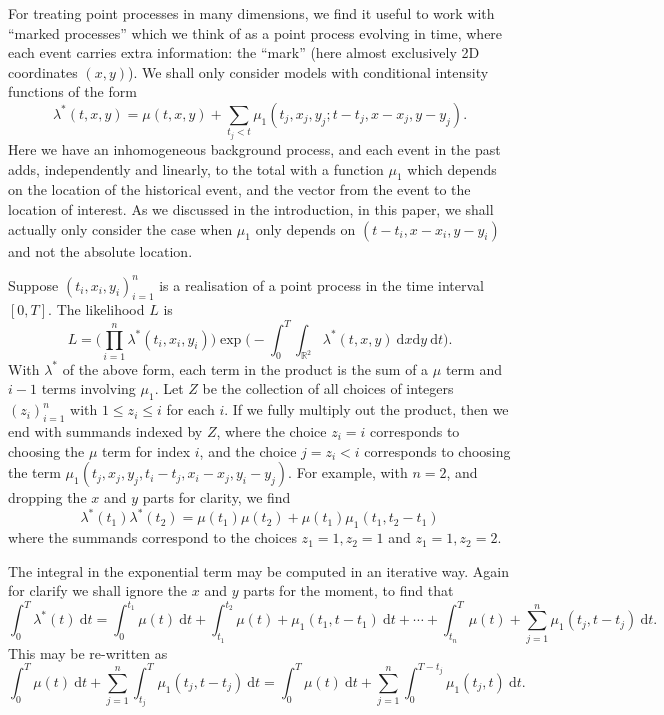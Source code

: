 \documentclass[twoside,a4paper]{article}
\theoremstyle{plain}
\theoremstyle{definition}
\newcommand{\rd}{\textrm{d}}
\begin{document}
For treating point processes in many dimensions, we find it useful to work with ``marked
processes'' which we think of as a point process evolving in time, where each event carries
extra information: the ``mark'' (here almost exclusively 2D coordinates $(x,y)$).  
We shall only consider models with conditional intensity functions of the form
\begin{equation}
\lambda^*(t,x,y) = \mu(t,x,y) + \sum_{t_j<t} \mu_1(t_j,x_j,y_j;t-t_j,x-x_j,y-y_j).
\label{eq:main}
\end{equation}
Here we have an inhomogeneous background process, and each event in the past adds,
independently and linearly, to the total with a function $\mu_1$ which depends on the
location of the historical event, and the vector from the event to the location of interest.
As we discussed in the introduction, in this paper, we shall actually only consider
the case when $\mu_1$ only depends on $(t-t_i,x-x_i,y-y_i)$ and not the absolute location.

Suppose $(t_i,x_i,y_i)_{i=1}^n$ is a realisation of a point process in the time interval
$[0,T]$.  The likelihood $L$ is
\[ L = \Big( \prod_{i=1}^n \lambda^*(t_i,x_i,y_i)\Big)
\exp\Big(-\int_0^T \int_{\mathbb R^2} \lambda^*(t,x,y) \ \rd x \rd y \ \rd t\Big). \]
With $\lambda^*$ of the above form, each term in the product is the sum of a $\mu$
term and $i-1$ terms involving $\mu_1$.  Let $Z$ be the collection of all choices of
integers $(z_i)_{i=1}^n$ with $1 \leq z_i \leq i$ for each $i$.  If we fully multiply out
the product, then we end with summands indexed by $Z$, where the choice $z_i=i$ corresponds
to choosing the $\mu$ term for index $i$, and the choice $j=z_i<i$ corresponds to choosing
the term $\mu_1(t_j,x_j,y_j,t_i-t_j,x_i-x_j,y_i-y_j)$.  For example, with $n=2$, and dropping
the $x$ and $y$ parts for clarity, we find
\[ \lambda^*(t_1)\lambda^*(t_2) = \mu(t_1)\mu(t_2) + \mu(t_1)\mu_1(t_1, t_2-t_1) \]
where the summands correspond to the choices $z_1=1,z_2=1$ and $z_1=1,z_2=2$.

The integral in the exponential term may be computed in an iterative way.  Again for
clarify we shall ignore the $x$ and $y$ parts for the moment, to find that
\[ \int_0^T \lambda^*(t) \ \rd t 
= \int_0^{t_1} \mu(t)  \ \rd t 
+ \int_{t_1}^{t_2} \mu(t) + \mu_1(t_1, t-t_1) \ \rd t
+ \cdots + \int_{t_n}^T \mu(t) + \sum_{j=1}^n \mu_1(t_j, t-t_j) \ \rd t. \]
This may be re-written as 
\[ \int_0^T \mu(t) \ \rd t + \sum_{j=1}^n \int_{t_j}^T \mu_1(t_j, t-t_j) \ \rd t
= \int_0^T \mu(t) \ \rd t + \sum_{j=1}^n \int_{0}^{T-t_j} \mu_1(t_j, t) \ \rd t. \]
\end{document}
